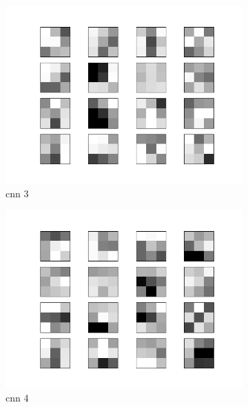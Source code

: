\documentclass{assignment}
\begin{document}
\begin{figure}[!htb]
\begin{subfigure}{0.3\textwidth}
        \includegraphics[width=\textwidth]{figures/weights_cnn_3.png}
        \caption{cnn 3}
    \end{subfigure}
    \hfill
    \begin{subfigure}{0.3\textwidth}
        \includegraphics[width=\textwidth]{figures/weights_cnn_4.png}
        \caption{cnn 4}
    \end{subfigure}\hfill
    \begin{subfigure}{0.3\textwidth}

\end{subfigure}
\end{figure}
\end{document}
